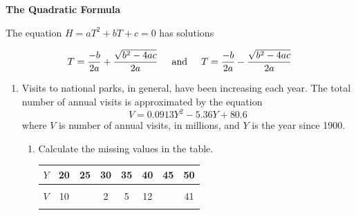 \documentclass[12pt]{article}
\begin{document}
 \vspace{.2in}
 
 \begin{center}
\textbf{The Quadratic Formula}
\vspace{.1in}

The equation $H=aT^2+bT+c=0$ has solutions 


$$\displaystyle T=\frac{-b}{2a} + \frac{\sqrt{b^2-4ac}}{2a} \hspace{.2in} \text{and} \hspace{.2in}T=\frac{-b}{2a} - \frac{\sqrt{b^2-4ac}}{2a}$$

 \end{center}
\hrulefill

\newpage

\begin{enumerate}

\item Visits to national parks, in general, have been increasing each year.  The total number of annual visits is approximated by the equation $$V = 0.0913Y^2-5.36Y+80.6$$
where $V$ is number of annual visits, in millions, and $Y$ is the year since 1900.

\begin{enumerate}
\item Calculate the missing values in the table.




\begin{center}
\begin{tabular} {|c ||c |c |c |c |c |c |c |} \hline
$Y$ & \hspace{.25in}20  \hspace{.25in}   &\hspace{.25in} 25\hspace{.25in} & \hspace{.25in} 30   \hspace{.25in} &\hspace{.25in} 35  \hspace{.25in}  & \hspace{.25in}40   \hspace{.25in}  &\hspace{.25in}45  \hspace{.25in}& \hspace{.25in} 50 \hspace{.25in}  \\ \hline
&&&&&&& \\
$V$ &10 &  & 2 & 5 & 12 &   & 41  \\ 
&&&&&&& \\ \hline
\end{tabular}
\end{center}





\end{enumerate}
\end{enumerate}
\end{document}
